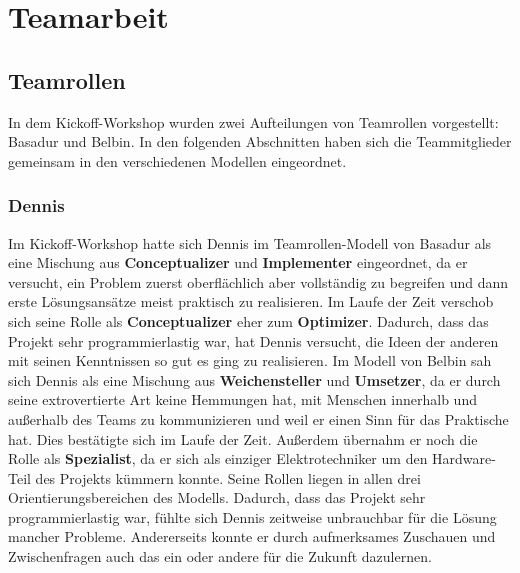 \documentclass[a4paper,12pt,headsepline]{scrartcl}
\begin{document}

	\newpage
	\section{Teamarbeit}
	
	\subsection{Teamrollen}
		In dem Kickoff-Workshop wurden zwei Aufteilungen von Teamrollen vorgestellt: Basadur und Belbin. In den folgenden Abschnitten haben sich die Teammitglieder gemeinsam in den verschiedenen Modellen eingeordnet.
	\subsubsection{Dennis}
Im Kickoff-Workshop hatte sich Dennis im Teamrollen-Modell von Basadur als eine Mischung aus \textbf{Conceptualizer} und \textbf{Implementer} eingeordnet, da er versucht, ein Problem zuerst oberflächlich aber vollständig zu begreifen und dann erste Lösungsansätze meist praktisch zu realisieren. Im Laufe der Zeit verschob sich seine Rolle als \textbf{Conceptualizer} eher zum \textbf{Optimizer}. Dadurch, dass das Projekt sehr programmierlastig war, hat Dennis versucht, die Ideen der anderen mit seinen Kenntnissen so gut es ging zu realisieren. Im Modell von Belbin sah sich Dennis als eine Mischung aus \textbf{Weichensteller} und \textbf{Umsetzer}, da er durch seine extrovertierte Art keine Hemmungen hat, mit Menschen innerhalb und außerhalb des Teams zu kommunizieren und weil er einen Sinn für das Praktische hat. Dies bestätigte sich im Laufe der Zeit. Außerdem übernahm er noch die Rolle als \textbf{Spezialist}, da er sich als einziger Elektrotechniker um den Hardware-Teil des Projekts kümmern konnte. Seine Rollen liegen in allen drei Orientierungsbereichen des Modells. Dadurch, dass das Projekt sehr programmierlastig war, fühlte sich Dennis zeitweise unbrauchbar für die Lösung mancher Probleme. Andererseits konnte er durch aufmerksames Zuschauen und Zwischenfragen auch das ein oder andere für die Zukunft dazulernen.
\end{document}

